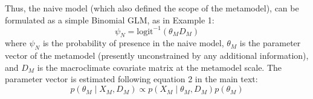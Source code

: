 \documentclass[11pt]{article}
\newcommand{\rev}[1]{{\color{RoyalBlue}#1}}
\begin{document}
\rev{Thus, the naive model (which also defined the scope of the metamodel), can be formulated as a simple Binomial GLM, as in Example 1:
\begin{equation}
\psi_N =\text{logit}^{-1}\left( \theta_M D_M \right)
\end{equation}
where \(\psi_N\) is the probability of presence in the naive model, \(\theta_M\) is the parameter vector of the metamodel (presently unconstrained by any additional information), and \(D_M\) is the macroclimate covariate matrix at the metamodel scale.
The parameter vector is estimated following equation 2 in the main text:
\begin{equation}
p\left (\theta_M \mid X_M,D_M \right ) \propto 
p \left(X_M \mid \theta_M, D_M \right)
p \left(\theta_M \right)
\end{equation}

}
\end{document}
